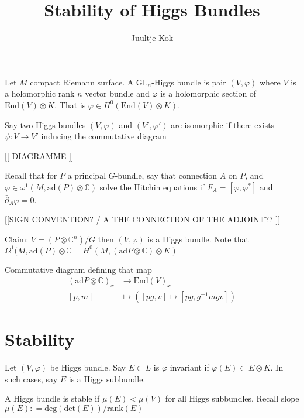 % 


\title{Stability of Higgs Bundles}
\author{Juultje Kok}
\date{}

 
\maketitle

\begin{definition}
    Let $M$ compact Riemann surface. 
    A $\mathrm{GL}_n $-Higgs bundle is pair $(V, \varphi)$ 
    where $ V$ is a holomorphic rank $n$ vector bundle and 
    $ \varphi$ is a holomorphic section of $ \mathrm{End}(V) \otimes K $.
    That is $ \varphi \in H^0 ( \mathrm{End} (V) \otimes K) $.
\end{definition}

\begin{definition}
    Say two Higgs bundles $(V, \varphi) $ and $(V', \varphi')$ are isomorphic if 
    there exists $ \psi: V \rightarrow  V'$ inducing the commutative diagram
    
    [[ DIAGRAMME ]] 
\end{definition}

Recall that for $P$ a principal $G$-bundle, 
say that connection $A$ on $P$, 
and $ \varphi \in \omega^1 ( M , \mathrm{ad} ( P) \otimes \mathbb{C} ) $ 
solve the Hitchin equations if $ F_ A = [ \varphi , \varphi ^* ] $ and $ \bar{\partial} _A \varphi = 0 $.

[[SIGN CONVENTION? / A THE CONNECTION OF THE ADJOINT?? ]] 

Claim: $ V = (P \otimes \mathbb{C} ^n) / G $ then $(V, \varphi) $ is a Higgs bundle. 
Note that $ \Omega^1 ( M, \mathrm{ad} ( P) \otimes \mathbb{C}  = H^0 ( M , ( \mathrm{ad} P \otimes \mathbb{C} ) \otimes K) $

Commutative diagram defining that map 
\begin{align}
    (\mathrm{ad}P \otimes \mathbb{C} )_x & \rightarrow  \mathrm{End}(V) _x \\
    [p, m ] & \mapsto ([pg, v] \mapsto [pg, g^{-1} m g v] ) 
\end{align}


\section{Stability} %

\begin{definition}
    Let $( V, \varphi) $ be Higgs bundle. 
    Say $ E \subset L$ is $ \varphi$ invariant if $ \varphi(E) \subset E \otimes K$. 
    In such cases, say $E$ is a Higgs subbundle. 

    A Higgs bundle is stable if $\mu(E) < \mu(V) $ for all Higgs subbundles. 
    Recall slope $ \mu(E) : = \mathrm{deg} ( \mathrm{det}(E)) / \mathrm{rank}(E) $ 
\end{definition}


